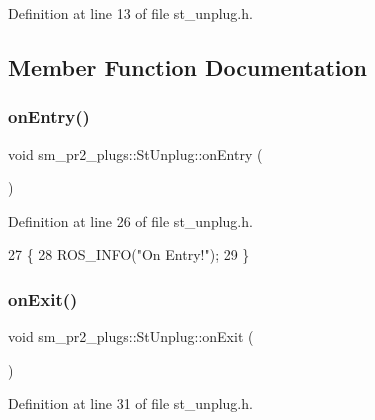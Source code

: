 Definition at line 13 of file st\+\_\+unplug.\+h.



\subsection{Member Function Documentation}
\mbox{\label{structsm__pr2__plugs_1_1StUnplug_a9c662e3a8145efd71cfdb73a66c4eefd}} 
\subsubsection{\texorpdfstring{on\+Entry()}{onEntry()}}
{\footnotesize\ttfamily void sm\+\_\+pr2\+\_\+plugs\+::\+St\+Unplug\+::on\+Entry (\begin{DoxyParamCaption}{ }\end{DoxyParamCaption})\hspace{0.3cm}{\ttfamily [inline]}}



Definition at line 26 of file st\+\_\+unplug.\+h.


\begin{DoxyCode}
27     \{
28         ROS\_INFO(\textcolor{stringliteral}{"On Entry!"});
29     \}
\end{DoxyCode}
\mbox{\label{structsm__pr2__plugs_1_1StUnplug_a4d6f2b2c10aaee954441ef36356fa364}} 
\subsubsection{\texorpdfstring{on\+Exit()}{onExit()}}
{\footnotesize\ttfamily void sm\+\_\+pr2\+\_\+plugs\+::\+St\+Unplug\+::on\+Exit (\begin{DoxyParamCaption}{ }\end{DoxyParamCaption})\hspace{0.3cm}{\ttfamily [inline]}}



Definition at line 31 of file st\+\_\+unplug.\+h.


